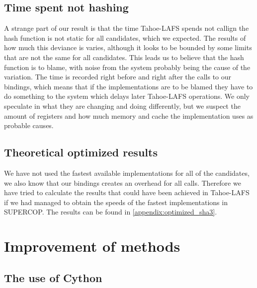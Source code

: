 \documentclass[english,12pt,a4paper]{book}
\begin{document}
\subsection{Time spent not hashing} A strange part of our result is that the
time Tahoe-\ac{LAFS} spends not callign the hash function is not static for all
candidates, which we expected.  The results of how much this deviance is
varies, although it looks to be bounded by some limits that are not the same
for all candidates. This leads us to believe that the hash function is to
blame, with noise from the system probably being the cause of the variation.
The time is recorded right before and right after the calls to our bindings,
which means that if the implementations are to be blamed they have to do
something to the system which delays later Tahoe-{LAFS} operations. We only
speculate in what they are changing and doing differently, but we suspect the
amount of registers and how much memory and cache the implementation uses as
probable causes.

\subsection{Theoretical optimized results}

We have not used the fastest available implementations for all of the
candidates, we also know that our bindings creates an overhead for all calls.
Therefore we have tried to calculate the results that could have been achieved
in Tahoe-\ac{LAFS} if we had managed to obtain the speeds of the fastest
implementations in \ac{SUPERCOP}. The results can be found in
\autoref{appendix:optimized_sha3}.

%
%

\section{Improvement of methods}

\subsection{The use of Cython}

\end{document}
